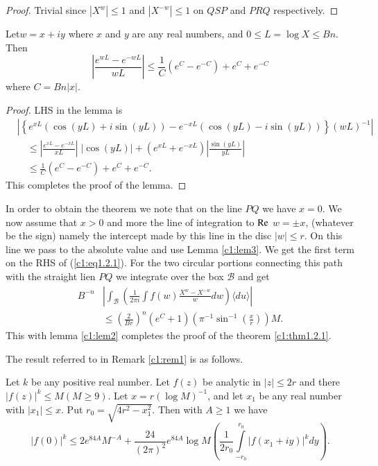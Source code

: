 \begin{proof}
Trivial since $|X^w| \leq 1$ and $|X^{-w}| \leq 1$ on $QSP$ and $PRQ$ respectively.
\end{proof}

\begin{lem}\label{c1:lem3}
Let\pageoriginale $w = x+ iy$ where $x$ and $y$ are any real numbers, and $0 \leq L = \log X \leq Bn$. Then
\begin{equation*}
\left|\frac{e^{wL} - e^{-wL}}{wL} \right| \leq \frac{1}{C} (e^C - e^{-C}) + e^C + e^{-C} 
\tag{1.2.9}\label{c1:eq1.2.9}
\end{equation*}
where $C = Bn |x|$.
\end{lem}

\begin{proof}
LHS in the lemma  is
\begin{align*}
&\left|\left\{ e^{xL} (\cos (yL) + i \sin(yL)) - e^{-xL} (\cos (yL) - i \sin (yL))\right\} (wL)^{-1}\right| \\
&\quad\leq \left| \frac{e^{xL} - e^{-xL}}{xL} \right| \; \Big| \cos (yL)
  \Big| + (e^{xL} + e^{-xL}) \left| \frac{\sin (yL)}{yL}\right|\\ 
&\quad\leq \frac{1}{C} (e^C - e^{-C}) + e^{C} + e^{-C}.
\end{align*}
This completes the proof of the lemma.
\end{proof}

In order to obtain the theorem we note that on the line $PQ$ we have $x = 0$. We now assume that $x >0$ and more the line of integration to $\operatorname{Re} $ $w = \pm x$, (whatever be the sign) namely the intercept made by this line in the disc $|w| \leq r$. On this line we pass to the absolute value and use Lemma \ref{c1:lem3}. We get the first term on the RHS of (\ref{c1:eq1.2.1}). For the two circular portions connecting this path with the straight lien $PQ$ we integrate over the box $\mathcal{B}$  and get
\begin{align*}
B^{-n} & \left| \int_\mathcal{B} \left( \frac{1}{2\pi i} \int f (w) \frac{X^w - X^{-w}}{w} dw\right) \langle du \rangle\right|\\
& \leq \left(\frac{2}{Br} \right)^n (e^C + 1) (\pi^{-1} \sin^{-1} \left(\frac{x}{r} \right))M.
\end{align*}
This with lemma \ref{c1:lem2} completes the proof of the theorem \ref{c1:thm1.2.1}.

The result referred to in Remark \ref{c1:rem1} is as follows.

\begin{theorem}\label{c1:thm1.2.2}
Let $k$ be any positive real number. Let $f(z)$ be analytic in $|z| \leq 2r$ and there $|f(z)|^k \leq M(M \geq 9)$. Let $x =r(\log M)^{-1}$, and let $x_1$ be any real number with $|x_1| \leq x$. Put $r_0 = \sqrt{4r^2 - x^2_1}$. Then with $A \geq 1$ we have 
\begin{equation*}
|f(0)|^k \leq 2e^{84A} M^{-A} + \frac{24}{(2\pi)^2} e^{84A} \log M\left( \frac{1}{2r_0} \int\limits^{r_0}_{-r_0} |f(x_1 + iy)|^k dy\right). \tag{1.2.10}\label{c1:eq1.2.10}
\end{equation*}
\end{theorem}

